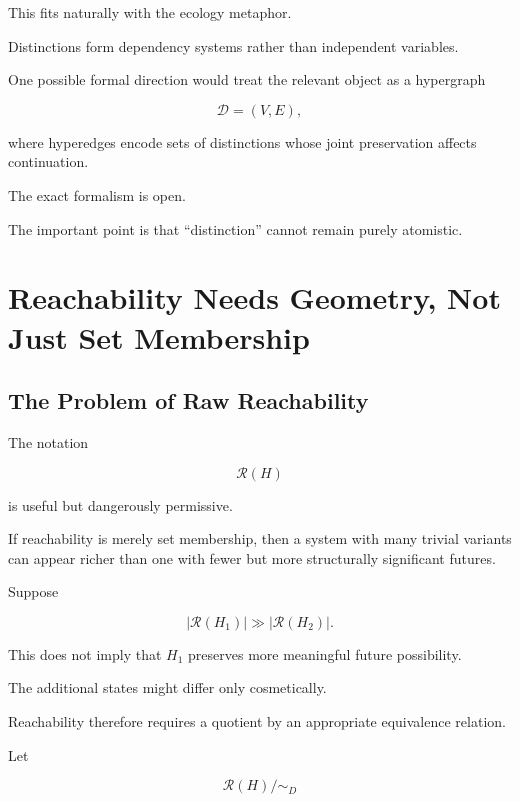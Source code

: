 \documentclass[11pt]{article}
\theoremstyle{remark}
\newcommand{\Reach}{\mathcal{R}}
\begin{document}
This fits naturally with the ecology metaphor.

Distinctions form dependency systems rather than independent variables.

One possible formal direction would treat the relevant object as a hypergraph

\begin{equation}
\mathcal{D}
=
(V,E),
\end{equation}

where hyperedges encode sets of distinctions whose joint preservation affects continuation.

The exact formalism is open.

The important point is that ``distinction'' cannot remain purely atomistic.

\section{Reachability Needs Geometry, Not Just Set Membership}

\subsection{The Problem of Raw Reachability}

The notation

\begin{equation}
\Reach(H)
\end{equation}

is useful but dangerously permissive.

If reachability is merely set membership, then a system with many trivial variants can appear richer than one with fewer but more structurally significant futures.

Suppose

\begin{equation}
|\Reach(H_1)|
\gg
|\Reach(H_2)|.
\end{equation}

This does not imply that $H_1$ preserves more meaningful future possibility.

The additional states might differ only cosmetically.

Reachability therefore requires a quotient by an appropriate equivalence relation.

Let

\begin{equation}
\Reach(H)/{\sim_D}
\end{equation}
\end{document}
